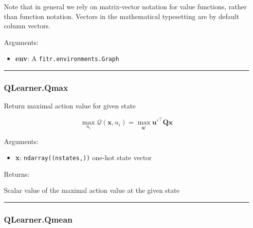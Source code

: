Note that in general we rely on matrix-vector notation for value
functions, rather than function notation. Vectors in the mathematical
typesetting are by default column vectors.

Arguments:

\begin{itemize}
\tightlist
\item
  \textbf{env}: A \texttt{fitr.environments.Graph}
\end{itemize}

\begin{center}\rule{0.5\linewidth}{\linethickness}\end{center}

\hypertarget{qlearner.qmax}{%
\subsubsection{QLearner.Qmax}\label{qlearner.qmax}}

\begin{Shaded}
\begin{Highlighting}[]
\end{Highlighting}
\end{Shaded}

Return maximal action value for given state

\[
\max_{u_i}\mathcal Q(\mathbf x, u_i) = \max_{\mathbf u'} \mathbf u'^\top \mathbf Q \mathbf x
\]

Arguments:

\begin{itemize}
\tightlist
\item
  \textbf{x}: \texttt{ndarray((nstates,))} one-hot state vector
\end{itemize}

Returns:

Scalar value of the maximal action value at the given state

\begin{center}\rule{0.5\linewidth}{\linethickness}\end{center}

\hypertarget{qlearner.qmean}{%
\subsubsection{QLearner.Qmean}\label{qlearner.qmean}}

\begin{Shaded}
\begin{Highlighting}[]
\end{Highlighting}
\end{Shaded}

